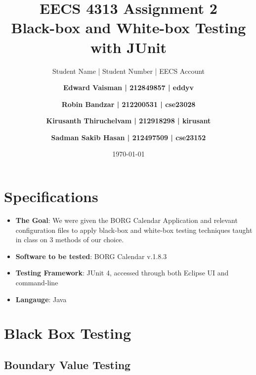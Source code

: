 \documentclass[fontsize=12pt,paper=letter,twoside]{scrartcl}
\author{Student Name | Student Number | EECS Account
\and \textbf{Edward Vaisman | 212849857 | eddyv}
\and \textbf{Robin Bandzar | 212200531 | cse23028}
\and \textbf{Kirusanth Thiruchelvam | 212918298 | kirusant}
\and \textbf{Sadman Sakib Hasan | 212497509 | cse23152}
}
\date{\today} %
\begin{document}
\title{EECS 4313 Assignment 2 \\Black-box and White-box Testing with JUnit}
\maketitle

\newpage

\tableofcontents


\newpage


\section{Specifications}
\begin{itemize}
\item \textbf{The Goal}: We were given the BORG Calendar Application and relevant configuration files to apply black-box and white-box testing techniques taught in class on 3 methods of our choice.
\item \textbf{Software to be tested}: BORG Calendar v.1.8.3
\item \textbf{Testing Framework}: JUnit 4, accessed through both Eclipse UI and command-line
\item \textbf{Langauge}: Java
\end{itemize}

\section{Black Box Testing}

\subsection{Boundary Value Testing}
\end{document}
